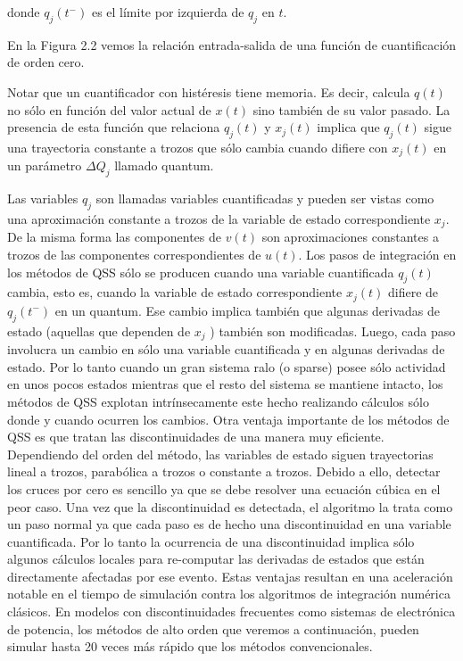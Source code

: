 \documentclass[a4paper,	11pt]{report}
\begin{document}
donde $q_j (t^{-})$ es el límite por izquierda de $q_j$ en $t$.

En la Figura 2.2 vemos la relación entrada-salida de una función de cuantificación de orden cero.

Notar que un cuantificador con histéresis tiene memoria. Es decir, calcula $q(t)$ no sólo en función del valor actual de $x(t)$ sino también de su valor pasado.
La presencia de esta función que relaciona $q_j (t)$ y $x_j (t)$ implica que $q_j (t)$ sigue una trayectoria constante a trozos que sólo cambia cuando difiere con $x_j (t)$ en un parámetro $\Delta Q_j$ llamado quantum.

Las variables $q_j$ son llamadas variables cuantificadas y pueden ser vistas como una aproximación constante a trozos de la variable de estado correspondiente $x_j$. De la misma forma las componentes de $v(t)$ son aproximaciones constantes a trozos de las componentes correspondientes de $u(t)$.  Los pasos de integración en los métodos de QSS sólo se producen cuando una variable cuantificada $q_j (t)$ cambia, esto es, cuando la variable de estado correspondiente $x_j (t)$ difiere de $q_j(t^{-})$ en un quantum. Ese cambio implica también que algunas derivadas de estado (aquellas que dependen de $x_j$ ) también son modificadas. Luego, cada paso involucra un cambio en sólo una variable cuantificada y en algunas derivadas de estado. Por lo tanto cuando un gran sistema ralo (o sparse) posee sólo actividad en unos pocos estados mientras que el resto del sistema se mantiene intacto, los métodos de QSS explotan intrínsecamente este hecho realizando cálculos sólo donde y cuando ocurren los cambios.
Otra ventaja importante de los métodos de QSS es que tratan las discontinuidades de una manera muy eficiente. Dependiendo del orden del método, las variables de estado siguen trayectorias lineal a trozos, parabólica a trozos o constante a trozos. Debido a ello, detectar los cruces por cero es sencillo ya que se debe resolver una ecuación cúbica en el peor caso. Una vez que la discontinuidad es detectada, el algoritmo la trata como un paso normal ya que cada paso es de hecho una discontinuidad en una variable cuantificada. Por lo tanto la ocurrencia de una discontinuidad implica sólo algunos cálculos locales para re-computar las derivadas de estados que están directamente afectadas por ese evento.
Estas ventajas resultan en una aceleración notable en el tiempo de simulación contra los algoritmos de integración numérica clásicos. En modelos con discontinuidades frecuentes como sistemas de electrónica de potencia, los métodos de alto orden que veremos a continuación, pueden simular hasta 20 veces más rápido que los métodos convencionales.
\end{document}
